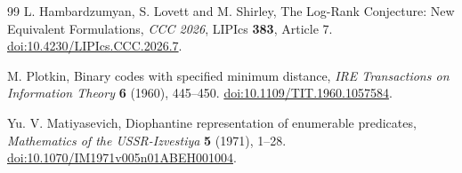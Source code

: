 \documentclass[11pt,a4paper]{article}
\theoremstyle{definition}
\theoremstyle{remark}
\numberwithin{equation}{section}
\begin{document}
\begin{thebibliography}{99}
L. Hambardzumyan, S. Lovett and M. Shirley,
The Log-Rank Conjecture: New Equivalent Formulations,
\emph{CCC 2026}, LIPIcs \textbf{383}, Article 7.
\href{https://doi.org/10.4230/LIPIcs.CCC.2026.7}{doi:10.4230/LIPIcs.CCC.2026.7}.

M. Plotkin, Binary codes with specified minimum distance,
\emph{IRE Transactions on Information Theory} \textbf{6} (1960), 445--450.
\href{https://doi.org/10.1109/TIT.1960.1057584}{doi:10.1109/TIT.1960.1057584}.

Yu. V. Matiyasevich,
Diophantine representation of enumerable predicates,
\emph{Mathematics of the USSR-Izvestiya} \textbf{5} (1971), 1--28.
\href{https://doi.org/10.1070/IM1971v005n01ABEH001004}{doi:10.1070/IM1971v005n01ABEH001004}.
\end{thebibliography}
\end{document}
